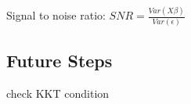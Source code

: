 \documentclass[12pt]{article}
\newcounter{lastnote}
\begin{document}
Signal to noise ratio: $SNR=\frac{Var(X\beta)}{Var(\epsilon)}$


\subsection*{Future Steps}

check KKT condition



% 















\clearpage
\end{document}
